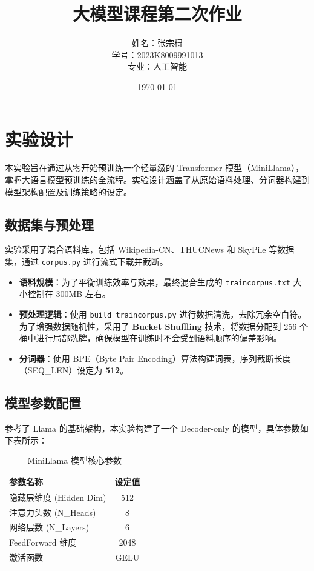 \documentclass[a4paper,12pt]{ctexart} %
\title{\textbf{大模型课程第二次作业}}
\author{姓名：张宗桪 \\ 学号：2023K8009991013 \\ 专业：人工智能}
\date{\today}
\begin{document}
\pagestyle{plain} %

\maketitle
\thispagestyle{empty} %
\newpage

\tableofcontents
\newpage
\section{实验设计}

本实验旨在通过从零开始预训练一个轻量级的 Transformer 模型（MiniLlama），掌握大语言模型预训练的全流程。实验设计涵盖了从原始语料处理、分词器构建到模型架构配置及训练策略的设定。

\subsection{数据集与预处理}
实验采用了混合语料库，包括 Wikipedia-CN、THUCNews 和 SkyPile 等数据集，通过 \texttt{corpus.py} 进行流式下载并截断。
\begin{itemize}
    \item \textbf{语料规模}：为了平衡训练效率与效果，最终混合生成的 \texttt{traincorpus.txt} 大小控制在 300MB 左右。
    \item \textbf{预处理逻辑}：使用 \texttt{build_traincorpus.py} 进行数据清洗，去除冗余空白符。为了增强数据随机性，采用了 \textbf{Bucket Shuffling} 技术，将数据分配到 256 个桶中进行局部洗牌，确保模型在训练时不会受到语料顺序的偏差影响。
    \item \textbf{分词器}：使用 BPE（Byte Pair Encoding）算法构建词表，序列截断长度（SEQ\_LEN）设定为 \textbf{512}。
\end{itemize}

\subsection{模型参数配置}
参考了 Llama 的基础架构，本实验构建了一个 Decoder-only 的模型，具体参数如下表所示：

\begin{table}[H]
    \centering
    \caption{MiniLlama 模型核心参数}
    \begin{tabular}{lc}
        \toprule
        参数名称 & 设定值 \\
        \midrule
        隐藏层维度 (Hidden Dim) & 512 \\
        注意力头数 (N\_Heads) & 8 \\
        网络层数 (N\_Layers) & 6 \\
        FeedForward 维度 & 2048 \\
        激活函数 & GELU \\
        \bottomrule
    \end{tabular}
\end{table}
\end{document}
